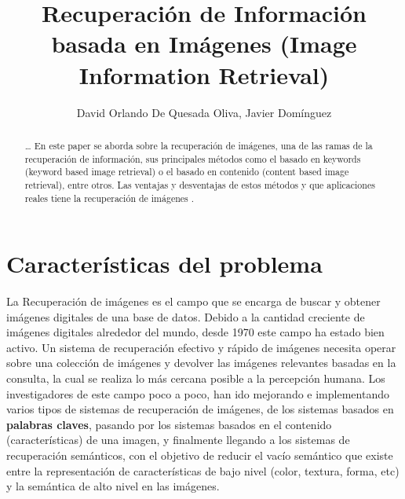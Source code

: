 \documentclass{llncs}
\begin{document}
%
\title{Recuperación de Información basada en Imágenes (Image Information Retrieval)}
\author{David Orlando De Quesada Oliva, Javier Dom\'inguez}
\maketitle

\begin{abstract}
    \dots
    En este paper se aborda sobre la recuperaci\'on de im\'agenes, una de las ramas de la
    recuperaci\'on de informaci\'on, sus principales m\'etodos como el basado en keywords
    (keyword based image retrieval) o el basado en contenido (content based image retrieval),
    entre otros. Las ventajas y desventajas de estos m\'etodos y que aplicaciones reales tiene 
    la recuperaci\'on de im\'agenes .

\end{abstract}

\tableofcontents
%

  



\chapter*{Caracter\'isticas del problema}
La Recuperación de im\'agenes es el campo que se encarga de buscar y obtener imágenes 
digitales de una base  de datos. Debido a la cantidad creciente de imágenes digitales 
alrededor del mundo, desde 1970 este campo ha estado bien activo. Un sistema de 
recuperación efectivo y rápido de imágenes necesita operar sobre una colección de 
imágenes y devolver las imágenes relevantes basadas en la consulta, la cual 
se realiza lo más cercana posible a la percepción humana. Los investigadores de este 
campo poco a poco, han ido mejorando e implementando varios tipos de sistemas de recuperación 
de imágenes, de los sistemas basados en \textbf{palabras claves}, pasando por los sistemas 
basados en el contenido (características) de una imagen, y finalmente llegando a los 
sistemas de recuperación semánticos, con el objetivo de reducir el vacío semántico que 
existe entre la representación de características de bajo nivel (color, textura, forma, etc) y 
la semántica de alto nivel en las imágenes.
\end{document}
